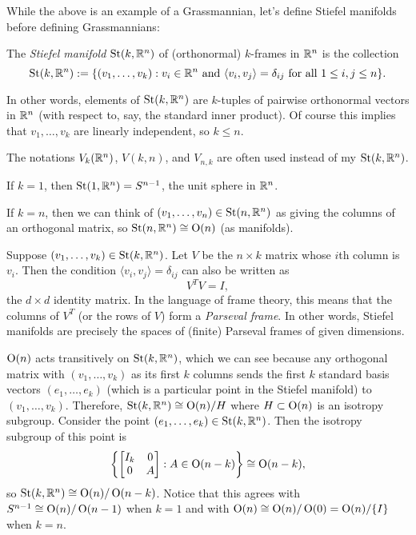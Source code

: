 While the above is an example of a Grassmannian, let's define Stiefel manifolds before defining Grassmannians:

\begin{definition}\label{def:stiefel}
	The \emph{Stiefel manifold} $\operatorname{St}(k,\mathbb{R}^n)$ of (orthonormal) $k$-frames in $\mathbb{R}^n$ is the collection
	\[
		\operatorname{St}(k,\mathbb{R}^n) := \{(v_1, \dots , v_k) : v_i \in \mathbb{R}^n \text{ and } \langle v_i, v_j \rangle = \delta_{ij} \text{ for all } 1 \leq i , j \leq n\}.
	\]
\end{definition}

In other words, elements of $\operatorname{St}(k,\mathbb{R}^n)$ are $k$-tuples of pairwise orthonormal vectors in $\mathbb{R}^n$ (with respect to, say, the standard inner product). Of course this implies that $v_1, \dots , v_k$ are linearly independent, so $k \leq n$.

\begin{remark}
	The notations $V_k(\mathbb{R}^n)$, $V(k,n)$, and $V_{n,k}$ are often used instead of my $\operatorname{St}(k,\mathbb{R}^n)$.
\end{remark}

\begin{example}
	If $k=1$, then $\operatorname{St}(1,\mathbb{R}^n) = S^{n-1}$, the unit sphere in $\mathbb{R}^n$.
\end{example}

\begin{example}
	If $k=n$, then we can think of $(v_1, \dots , v_n) \in \operatorname{St}(n,\mathbb{R}^n)$ as giving the columns of an orthogonal matrix, so $\operatorname{St}(n,\mathbb{R}^n) \cong \operatorname{O}(n)$ (as manifolds).
\end{example}

\begin{remark}
	Suppose $(v_1, \dots , v_k) \in \operatorname{St}(k,\mathbb{R}^n)$. Let $V$ be the $n \times k$ matrix whose $i$th column is $v_i$. Then the condition $\langle v_i, v_j \rangle = \delta_{ij}$ can also be written as
	\[
		V^T V = I,
	\]
	the $d \times d$ identity matrix. In the language of frame theory, this means that the columns of $V^T$ (or the rows of $V$) form a \emph{Parseval frame}. In other words, Stiefel manifolds are precisely the spaces of (finite) Parseval frames of given dimensions.
\end{remark}

$\operatorname{O}(n)$ acts transitively on $\operatorname{St}(k,\mathbb{R}^n)$, which we can see because any orthogonal matrix with $(v_1, \dots , v_k)$ as its first $k$ columns sends the first $k$ standard basis vectors $(e_1, \dots , e_k)$ (which is a particular point in the Stiefel manifold) to $(v_1, \dots , v_k)$. Therefore, $\operatorname{St}(k,\mathbb{R}^n) \cong \operatorname{O}(n)/H$ where $H \subset \operatorname{O}(n)$ is an isotropy subgroup. Consider the point $(e_1, \dots , e_k) \in \operatorname{St}(k, \mathbb{R}^n)$. Then the isotropy subgroup of this point is
\[
	\left\{ \begin{bmatrix} I_k & 0 \\ 0 & A \end{bmatrix}: A \in \operatorname{O}(n-k)\right\} \cong \operatorname{O}(n-k),
\]
so $\operatorname{St}(k,\mathbb{R}^n) \cong \operatorname{O}(n)/\operatorname{O}(n-k)$. Notice that this agrees with $S^{n-1} \cong \operatorname{O}(n)/\operatorname{O}(n-1)$ when $k=1$ and with $\operatorname{O}(n) \cong \operatorname{O}(n)/\operatorname{O}(0) = \operatorname{O}(n)/\{I\}$ when $k=n$.

